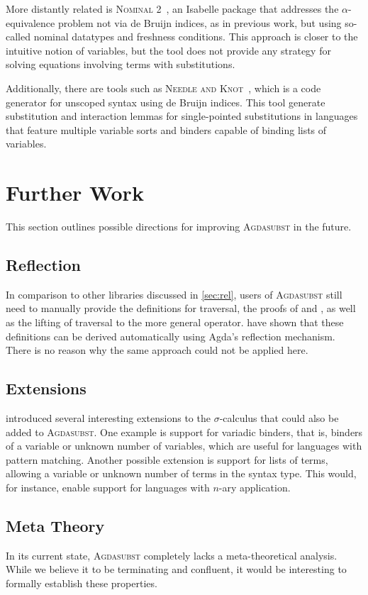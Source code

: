 \documentclass[screen,nonacm]{acmart}
\begin{document}
More distantly related is \textsc{Nominal 2}~\cite{CITE}, 
an Isabelle package that addresses the $\alpha$-equivalence problem not via de Bruijn indices, 
as in previous work, but using so-called nominal datatypes and freshness conditions. 
This approach is closer to the intuitive notion of variables, but the tool does not provide 
any strategy for solving equations involving terms with substitutions. 

Additionally, there are tools such as \textsc{Needle and Knot}~\cite{CITE}, 
which is a code generator for unscoped syntax using de Bruijn indices. 
This tool generate substitution and interaction lemmas for single-pointed substitutions 
in languages that feature multiple variable sorts and binders capable of binding lists of variables.

\section{Further Work}\label{sec:con-wrk}
This section outlines possible directions for improving \textsc{Agdasubst} in
the future.

\subsection*{Reflection}
In comparison to other libraries discussed in \cref{sec:rel}, users of
\textsc{Agdasubst} still need to manually provide the definitions for
traversal, the proofs of  and ,
as well as the lifting of traversal to the more general operator.
\citeauthor{CITE} have shown that these definitions can be derived
automatically using Agda's reflection mechanism. There is no reason why the
same approach could not be applied here.

\subsection*{Extensions}
\citeauthor{CITE} introduced several interesting extensions to the $\sigma$-calculus that could
also be added to \textsc{Agdasubst}. One example is support for variadic binders,
that is, binders of a variable or unknown number of variables, which are useful for languages with
pattern matching. Another possible extension is support for lists of terms, allowing a variable or
unknown number of terms in the syntax type. This would, for instance, enable support for
languages with $n$-ary application.

\subsection*{Meta Theory}
In its current state, \textsc{Agdasubst} completely lacks a meta-theoretical
analysis. While we believe it to be terminating and confluent, it would be
interesting to formally establish these properties.
\end{document}
